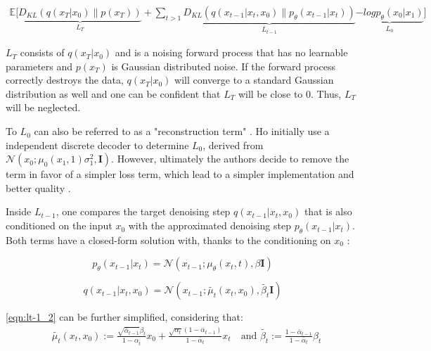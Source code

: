 \begin{equation}
  \label{eqn:vlb3}
  \begin{align*}
   \mathbb{E}\biggl[\underbrace{D_{KL}(q(x_{T}|x_0) \parallel p(x_T))}_{L_T} + \sum_{t>1}^{} \underbrace{  D_{KL}(q(x_{t-1}|x_t,x_0) \parallel p_\theta(x_{t-1}|x_t)) }_{L_{t-1}}  \underbrace{ -log p_\theta(x_0|x_1) }_{L_{0}}\biggr]
  \end{align*}
\end{equation}

$L_T$ consists of $q(x_{T}|x_0)$ and is a noising forward process that has no learnable parameters and $p(x_T)$ is Gaussian distributed noise.
If the forward process correctly destroys the data, $q(x_{T}|x_0)$ will converge to a standard Gaussian distribution as well and one can be confident that $L_T$ will be close to $0$.
Thus, $L_T$ will be neglected.

To $L_{0}$ can also be referred to as a "reconstruction term" \cite[p. 10]{luo2022UnderstandingDiffusionModels}.
Ho \etal \cite{ho2020DenoisingDiffusionProbabilistic} initially use a independent discrete decoder to determine $L_{0}$, derived from $\mathcal{N}(x_0;\mu_0(x_1,1)\sigma^2_1,\textbf{I})$.
However, ultimately the authors decide to remove the term in  favor of a simpler loss term, which lead to a simpler implementation and better quality \cite{ho2020DenoisingDiffusionProbabilistic}.

Inside $L_{t-1}$, one compares the target denoising step $q(x_{t-1}|x_t,x_0)$ that is also conditioned on the input $x_0$ with the approximated denoising step $p_\theta(x_{t-1}|x_t)$.%
Both terms have a closed-form solution with, thanks to the conditioning on $x_0$ \cite{ho2020DenoisingDiffusionProbabilistic}:

\begin{equation}
  \label{eqn:lt-1_1}
  p_\theta(x_{t-1}|x_t)= \mathcal{N}(x_{t-1};\mu_\theta(x_t,t), \beta\textbf{I})
\end{equation}

\begin{equation}
  \label{eqn:lt-1_2}
q(x_{t-1}|x_t,x_0) = \mathcal{N}(x_{t-1};\tilde{\mu_t}(x_t,x_0), \tilde{\beta_t}\textbf{I})
\end{equation}

\autoref{eqn:lt-1_2} can be further simplified, considering that:
\begin{equation}
  \begin{align}
    &\tilde{\mu_t}(x_t, x_0) := \frac{\sqrt{\bar{\alpha}_{t-1}}\beta_t}{1 - \alpha_{\bar{t}}}x_0 +   \frac{\sqrt{\alpha_t}(1-\bar{\alpha}_{t-1})}{1 - \bar{\alpha}_{t}}x_t \quad \textrm{and }
    \tilde{\beta_t}:=\frac{1-\bar{\alpha}_{t-1}}{1-\bar{\alpha}_t}\beta_t \nonumber\\
  \end{align}
\end{equation}
    
